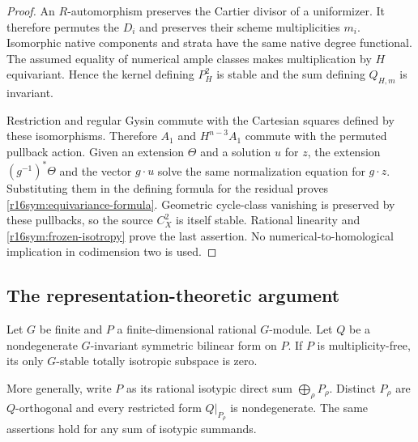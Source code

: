 \begin{proof}
An $R$-automorphism preserves the Cartier divisor of a
uniformizer.  It therefore permutes the $D_i$ and preserves
their scheme multiplicities $m_i$.  Isomorphic native
components and strata have the same native degree functional.
The assumed equality of numerical ample classes makes
multiplication by $H$ equivariant.  Hence the kernel defining
$P_H^2$ is stable and the sum defining $Q_{H,m}$ is invariant.

Restriction and regular Gysin commute with the Cartesian
squares defined by these isomorphisms.  Therefore $A_1$ and
$H^{n-3}A_1$ commute with the permuted pullback action.  Given
an extension $\Theta$ and a solution $u$ for $z$, the extension
$(g^{-1})^*\Theta$ and the vector $g\cdot u$ solve the same
normalization equation for $g\cdot z$.  Substituting them in
the defining formula for the residual proves
\eqref{r16sym:equivariance-formula}.  Geometric cycle-class
vanishing is preserved by these pullbacks, so the source
$C_X^2$ is itself stable.  Rational linearity and
\eqref{r16sym:frozen-isotropy} prove the last assertion.
No numerical-to-homological implication in codimension two
is used.
\end{proof}

\subsection{The representation-theoretic argument}

\begin{lemma}
\label{r16sym:linear-algebra}
Let $G$ be finite and $P$ a finite-dimensional rational
$G$-module.  Let $Q$ be a nondegenerate $G$-invariant symmetric
bilinear form on $P$.  If $P$ is multiplicity-free, its only
$G$-stable totally isotropic subspace is zero.

More generally, write $P$ as its rational isotypic direct sum
$\bigoplus_\rho P_\rho$.  Distinct $P_\rho$ are
$Q$-orthogonal and every restricted form $Q|_{P_\rho}$ is
nondegenerate.  The same assertions hold for any sum of
isotypic summands.
\end{lemma}

